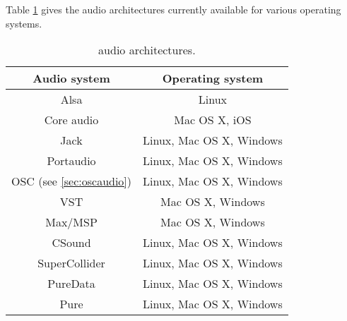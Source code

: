 Table \ref{tab:aarch} gives the audio architectures currently available for various operating systems.
\begin{table}[htdp]
\begin{center}
\begin{tabular}{|c|c|}
\hline
\bf{Audio system} & \bf{Operating system} \\
\hline
Alsa  & Linux \\
Core audio 		& Mac OS X, iOS \\
Jack 				& Linux, Mac OS X, Windows \\
Portaudio 			& Linux, Mac OS X, Windows \\
OSC {\footnotesize (see \ref{sec:oscaudio})} & Linux, Mac OS X, Windows \\
VST					& Mac OS X, Windows \\
Max/MSP				& Mac OS X, Windows \\
CSound				& Linux, Mac OS X, Windows \\
SuperCollider		& Linux, Mac OS X, Windows \\
PureData			& Linux, Mac OS X, Windows \\
Pure \cite{graef09}				& Linux, Mac OS X, Windows \\
\hline
\end{tabular}
\end{center}
\caption{\faust audio architectures.}
\label{tab:aarch}
\end{table}%
 

% 


